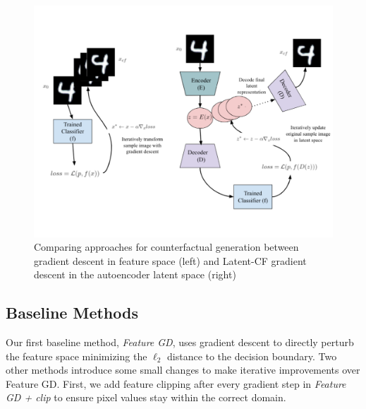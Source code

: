 \documentclass[letterpaper]{article} %
\begin{document}
\begin{figure}[hbt!]
    \centering
    \includegraphics[width=0.99\linewidth,trim=30 75 0 85]{figures/mnist/Architecture}
    \caption{Comparing approaches for counterfactual generation between gradient descent in feature space (left) and Latent-CF gradient descent in the autoencoder latent space (right)}
    \label{fig:arch}
\end{figure}

\subsection{Baseline Methods}
Our first baseline method, \textit{Feature GD}, uses gradient descent to directly perturb the feature space minimizing the $\ell_{2}$ distance to the decision boundary. Two other methods introduce some small changes to make iterative improvements over Feature GD. First, we add feature clipping after every gradient step in \textit{Feature GD + clip} to ensure pixel values stay within the correct domain. 

\end{document}
